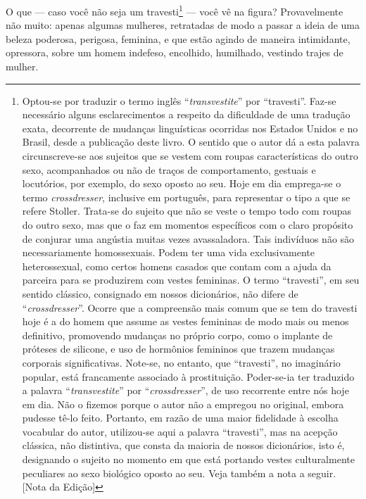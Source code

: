O que --- caso você não seja um travesti\footnote{ Optou-se por traduzir
o termo inglês ``\textit{transvestite}'' por “travesti”.
Faz-se necessário alguns esclarecimentos a respeito da dificuldade de uma
tradução exata, decorrente de mudanças linguísticas ocorridas nos Estados Unidos
e no Brasil, desde a publicação deste livro. O sentido que o autor dá a esta
palavra circunscreve-se aos sujeitos que se vestem com roupas características do
outro sexo, acompanhados ou não de traços de comportamento, gestuais e
locutórios, por exemplo, do sexo oposto ao seu. Hoje em dia emprega-se o termo
\textit{crossdresser}, inclusive em português, para representar o tipo a que
se refere Stoller. Trata-se do sujeito que não se veste o tempo todo com roupas
do outro sexo, mas que o faz em momentos específicos com o claro propósito de
conjurar uma angústia muitas vezes avassaladora. Tais indivíduos não são
necessariamente homossexuais. Podem ter uma vida exclusivamente heterossexual,
como certos homens casados que contam com a ajuda da parceira para se produzirem
com vestes femininas. O termo “travesti”, em seu sentido clássico, consignado em
nossos dicionários, não difere de “\textit{crossdresser}”. Ocorre que a
compreensão mais comum que se tem do travesti hoje é a do homem que assume as
vestes femininas de modo mais ou menos definitivo, promovendo mudanças no
próprio corpo, como o implante de próteses de silicone, e uso de hormônios
femininos que trazem mudanças corporais significativas. Note-se, no entanto, que
``travesti'', no imaginário popular, está francamente associado à prostituição.
Poder-se-ia ter traduzido a palavra “\textit{transvestite}” por
“\textit{crossdresser}”, de uso recorrente entre nós hoje em dia. Não o fizemos
porque o autor não a empregou no original, embora pudesse tê-lo feito. Portanto,
em razão de uma maior fidelidade à escolha vocabular do autor, utilizou-se aqui
a palavra “travesti”, mas na acepção clássica, não distintiva, que consta da
maioria de nossos dicionários, isto é, designando o sujeito no momento em que
está portando vestes culturalmente peculiares ao sexo biológico oposto ao seu.
Veja também a nota a seguir. [Nota da Edição]}
 --- você vê na figura?
Provavelmente não muito: apenas algumas mulheres, retratadas de modo a
passar a ideia de uma beleza poderosa, perigosa, feminina, e que estão
agindo de maneira intimidante, opressora, sobre um homem indefeso,
encolhido, humilhado,\idxtravemhumi{} vestindo trajes de mulher.

